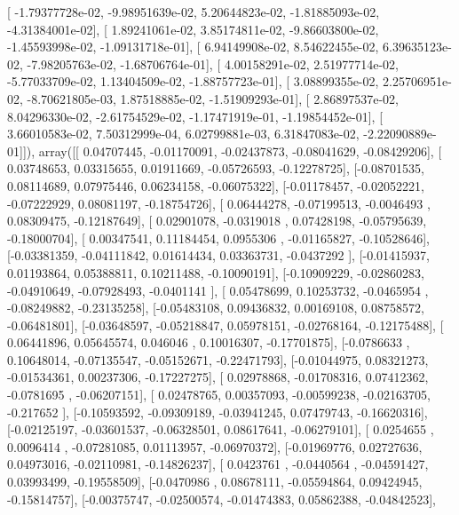 \documentclass{article}
\begin{document}
       [ -1.79377728e-02,  -9.98951639e-02,   5.20644823e-02,
         -1.81885093e-02,  -4.31384001e-02],
       [  1.89241061e-02,   3.85174811e-02,  -9.86603800e-02,
         -1.45593998e-02,  -1.09131718e-01],
       [  6.94149908e-02,   8.54622455e-02,   6.39635123e-02,
         -7.98205763e-02,  -1.68706764e-01],
       [  4.00158291e-02,   2.51977714e-02,  -5.77033709e-02,
          1.13404509e-02,  -1.88757723e-01],
       [  3.08899355e-02,   2.25706951e-02,  -8.70621805e-03,
          1.87518885e-02,  -1.51909293e-01],
       [  2.86897537e-02,   8.04296330e-02,  -2.61754529e-02,
         -1.17471919e-01,  -1.19854452e-01],
       [  3.66010583e-02,   7.50312999e-04,   6.02799881e-03,
          6.31847083e-02,  -2.22090889e-01]]), array([[ 0.04707445, -0.01170091, -0.02437873, -0.08041629, -0.08429206],
       [ 0.03748653,  0.03315655,  0.01911669, -0.05726593, -0.12278725],
       [-0.08701535,  0.08114689,  0.07975446,  0.06234158, -0.06075322],
       [-0.01178457, -0.02052221, -0.07222929,  0.08081197, -0.18754726],
       [ 0.06444278, -0.07199513, -0.0046493 ,  0.08309475, -0.12187649],
       [ 0.02901078, -0.0319018 ,  0.07428198, -0.05795639, -0.18000704],
       [ 0.00347541,  0.11184454,  0.0955306 , -0.01165827, -0.10528646],
       [-0.03381359, -0.04111842,  0.01614434,  0.03363731, -0.0437292 ],
       [-0.01415937,  0.01193864,  0.05388811,  0.10211488, -0.10090191],
       [-0.10909229, -0.02860283, -0.04910649, -0.07928493, -0.0401141 ],
       [ 0.05478699,  0.10253732, -0.0465954 , -0.08249882, -0.23135258],
       [-0.05483108,  0.09436832,  0.00169108,  0.08758572, -0.06481801],
       [-0.03648597, -0.05218847,  0.05978151, -0.02768164, -0.12175488],
       [ 0.06441896,  0.05645574,  0.046046  ,  0.10016307, -0.17701875],
       [-0.0786633 ,  0.10648014, -0.07135547, -0.05152671, -0.22471793],
       [-0.01044975,  0.08321273, -0.01534361,  0.00237306, -0.17227275],
       [ 0.02978868, -0.01708316,  0.07412362, -0.0781695 , -0.06207151],
       [ 0.02478765,  0.00357093, -0.00599238, -0.02163705, -0.217652  ],
       [-0.10593592, -0.09309189, -0.03941245,  0.07479743, -0.16620316],
       [-0.02125197, -0.03601537, -0.06328501,  0.08617641, -0.06279101],
       [ 0.0254655 ,  0.0096414 , -0.07281085,  0.01113957, -0.06970372],
       [-0.01969776,  0.02727636,  0.04973016, -0.02110981, -0.14826237],
       [ 0.0423761 , -0.0440564 , -0.04591427,  0.03993499, -0.19558509],
       [-0.0470986 ,  0.08678111, -0.05594864,  0.09424945, -0.15814757],
       [-0.00375747, -0.02500574, -0.01474383,  0.05862388, -0.04842523],
\end{document}
